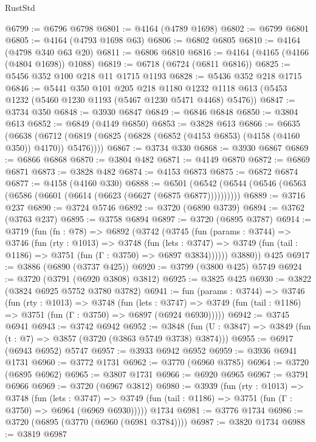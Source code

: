 \begin{lexlean}{RustStd}
\begin{coremodule}
@6799 := @6796 @6798
@6801 := @4164 (@4789 @1698)
@6802 := @6799 @6801
@6805 := @4164 (@4793 @1698 @63)
@6806 := @6802 @6805
@6810 := @4164 (@4798 @340 @63 @20)
@6811 := @6806 @6810
@6816 := @4164 (@4165 (@4166 (@4804 @1698)) @1088)
@6819 := @6718 (@6724 (@6811 @6816))
@6825 := @5456 @352 @100 @218 @11 @1715 @1193
@6828 := @5436 @352 @218 @1715
@6846 := @5441
    @350
    @101
    @205
    @218
    @1180
    @1232
    @1118
    @613
    (@5453 @1232 (@5460 @1230 @1193 (@5467 @1230 @5471 @4468) @5476))
@6847 := @3734 @350
@6848 := @3930 @6847
@6849 := @6846 @6848
@6850 := @3804 @613
@6852 := @6849 (@4149 @6850)
@6853 := @3828 @613
@6866 := @6635
    (@6638 (@6712 (@6819 (@6825 (@6828 (@6852 (@4153 @6853) (@4158 (@4160 @350)) @4170)) @5476))))
@6867 := @3734 @330
@6868 := @3930 @6867
@6869 := @6866 @6868
@6870 := @3804 @482
@6871 := @4149 @6870
@6872 := @6869 @6871
@6873 := @3828 @482
@6874 := @4153 @6873
@6875 := @6872 @6874
@6877 := @4158 (@4160 @330)
@6888 := @6501 (@6542 (@6544 (@6546 (@6563 (@6586 (@6601 (@6614 (@6623 (@6627 (@6875 @6877))))))))))
@6889 := @3716 @237
@6890 := @3724 @5746
@6892 := @3720 (@6890 @3739)
@6894 := @3762 (@3763 @237)
@6895 := @3758 @6894
@6897 := @3720 (@6895 @3787)
@6914 := @3719
    (fun (fn : @78) =>
    @6892
      (@3742
        (@3745
          (fun (params : @3744) =>
          @3746
            (fun (rty : @1013) =>
            @3748
              (fun (lets : @3747) =>
              @3749 (fun (tail : @1186) => @3751 (fun (Γ : @3750) => @6897 @3834))))))
        @3880))
    @425
@6917 := @3886 (@6890 (@3737 @425))
@6920 := @3799 (@3800 @425) @5749
@6924 := @3720 (@3791 (@6920 @3808) @3812)
@6925 := @3825 @425
@6930 := @3822 (@3824 @6925 @5752 @3780 @3782)
@6941 := fun (params : @3744) =>
  @3746
    (fun (rty : @1013) =>
    @3748
      (fun (lets : @3747) =>
      @3749 (fun (tail : @1186) => @3751 (fun (Γ : @3750) => @6897 (@6924 @6930)))))
@6942 := @3745 @6941
@6943 := @3742 @6942
@6952 := @3848 (fun (U : @3847) => @3849 (fun (t : @7) => @3857 (@3720 (@3863 @5749 @3738) @3874)))
@6955 := @6917 (@6943 @6952) @5747
@6957 := @3933 @6942 @6952
@6959 := @3936 @6941 @1731
@6960 := @3772 @1731
@6962 := @3770 (@6960 @3785)
@6964 := @3720 (@6895 @6962)
@6965 := @3807 @1731
@6966 := @6920 @6965
@6967 := @3791 @6966
@6969 := @3720 (@6967 @3812)
@6980 := @3939
    (fun (rty : @1013) =>
    @3748
      (fun (lets : @3747) =>
      @3749 (fun (tail : @1186) => @3751 (fun (Γ : @3750) => @6964 (@6969 @6930)))))
    @1734
@6981 := @3776 @1734
@6986 := @3720 (@6895 (@3770 (@6960 (@6981 @3784))))
@6987 := @3820 @1734
@6988 := @3819 @6987

\end{coremodule}
\end{lexlean}
